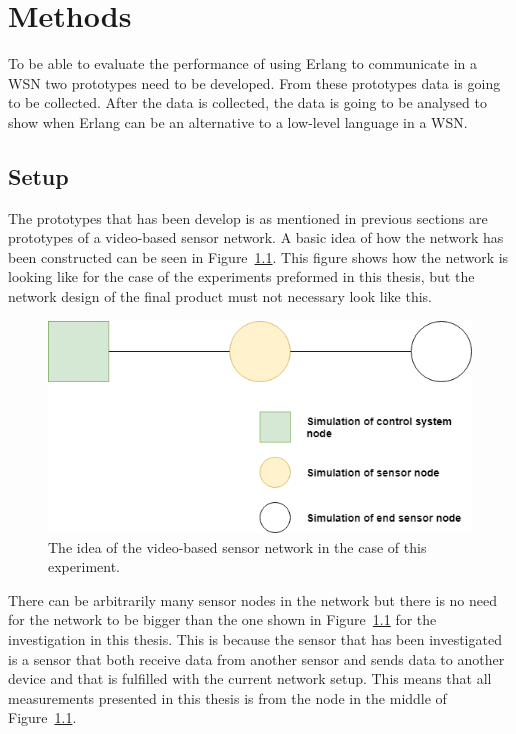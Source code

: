 \chapter{Methods}
To be able to evaluate the performance of using Erlang to communicate in a WSN two prototypes need to be developed. From these prototypes data is going to be collected. After the data is collected, the data is going to be analysed to show when Erlang can be an alternative to a low-level language in a WSN. 

\section{Setup}
The prototypes that has been develop is as mentioned in previous sections are prototypes of a  video-based sensor network. A basic idea of how the network has been constructed can be seen in Figure~\ref{fig:setup}. This figure shows how the network is looking like for the case of the experiments preformed in this thesis, but the network design of the final product must not necessary look like this. 

\begin{figure}[H]
\centering
\includegraphics[scale=0.6]{figure/setup.png}
\caption{The idea of the video-based sensor network in the case of this experiment.}
\label{fig:setup}
\end{figure}

There can be arbitrarily many sensor nodes in the network but there is no need for the network to be bigger than the one shown in Figure~\ref{fig:setup} for the investigation in this thesis. This is because the sensor that has been investigated is a sensor that both receive data from another sensor and sends data to another device and that is fulfilled with the current network setup. This means that all measurements presented in this thesis is from the node in the middle of Figure~\ref{fig:setup}. 

